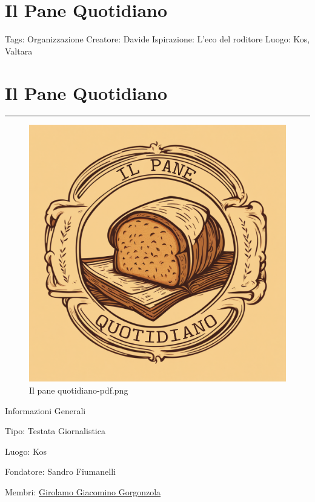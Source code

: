 \section{Il Pane Quotidiano}\label{il-pane-quotidiano}

Tags: Organizzazione Creatore: Davide Ispirazione: L'eco del roditore
Luogo: Kos, Valtara

\section{Il Pane Quotidiano}\label{il-pane-quotidiano-1}

\begin{center}\rule{0.5\linewidth}{0.5pt}\end{center}

\begin{figure}
\centering
\includegraphics{Il_pane_quotidiano-pdf.png}
\caption{Il pane quotidiano-pdf.png}
\end{figure}

Informazioni Generali

Tipo: Testata Giornalistica

Luogo: Kos

Fondatore: Sandro Fiumanelli

Membri:
\href{Girolamo\%20Giacomino\%20Gorgonzola\%208992648336664c4ab50e239a8554805c.md}{Girolamo
Giacomino Gorgonzola}

